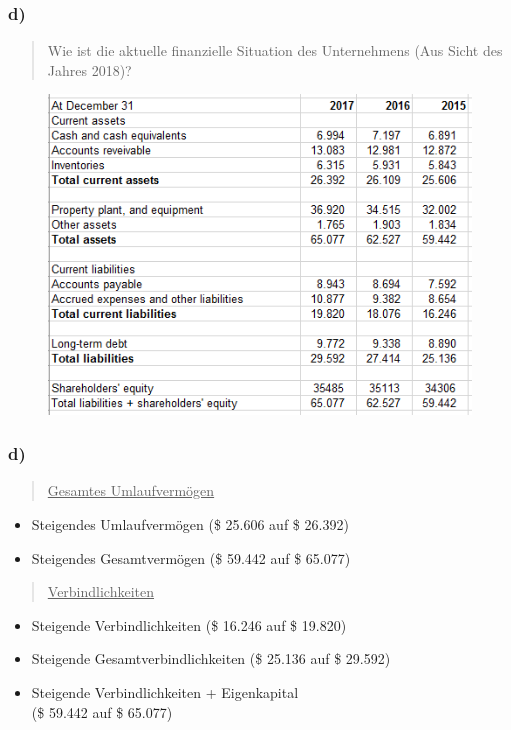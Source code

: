\documentclass{beamer}
\begin{document}
\begin{frame}
\frametitle{d)}

\begin{quote}
Wie ist die aktuelle finanzielle Situation des Unternehmens (Aus Sicht des Jahres 2018)?
\end{quote}

\begin{figure}
\includegraphics[scale=0.5]{financials2.PNG}
\end{figure}

\end{frame}

\begin{frame}
\frametitle{d)}

\begin{quote}
\underline{Gesamtes Umlaufverm\"ogen}
\end{quote}

\begin{itemize}
\item Steigendes Umlaufverm\"ogen (\$ 25.606 auf \$ 26.392)
\item Steigendes Gesamtverm\"ogen (\$ 59.442 auf \$ 65.077)
\end{itemize}

\begin{quote}
\underline{Verbindlichkeiten}
\end{quote}

\begin{itemize}
\item Steigende Verbindlichkeiten (\$ 16.246 auf \$ 19.820)
\item Steigende Gesamtverbindlichkeiten (\$ 25.136 auf \$ 29.592)
\item Steigende Verbindlichkeiten + Eigenkapital \\ (\$ 59.442 auf \$ 65.077)
\end{itemize}

\end{frame}
\end{document}
